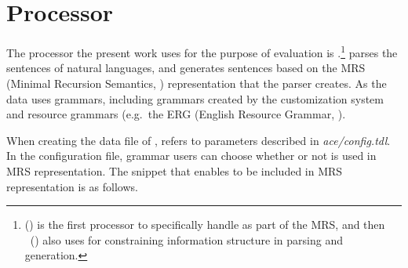 \section{Processor}
\label{12:sec:processor}

The processor the present work uses for the purpose of evaluation is
\isi{\ace}.\footnote{\isi{\ace}
  () is the first
   processor to specifically handle  as part
  of the MRS, and then \isi{\agree}~(\citealt{slayden:12}) also uses
   for constraining information structure in parsing and
  generation.}  \isi{\ace} parses the sentences of natural languages,
and generates sentences based on the MRS (Minimal Recursion
Semantics, \citealt{copestake:etal:05}) representation that the parser
creates.  As the data \isi{\ace} uses  grammars,
including \lingo {} grammars created by the
customization system
\citep{bender:flickinger:05,drellishak:09,bender:etal:10} and resource
grammars (e.g.\ the ERG (English Resource Grammar,
\citealt{flickinger:00}).






When creating the data file of \isi{\ace}, \ace refers to parameters
described in \textit{ace/config.tdl}. In the configuration file,
grammar users can choose whether or not  is used in MRS
representation. The snippet that enables  to be included in MRS
representation is as follows.



